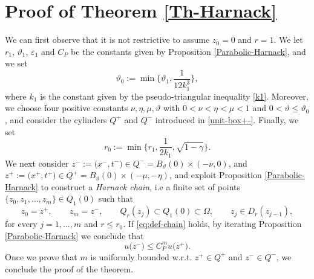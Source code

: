 \documentclass[11pt,a4paper]{article}
\numberwithin{equation}{section}
\def \e {{\varepsilon}}
\def \O {{\Omega}}
\begin{document}
{{\section{Proof of Theorem \ref{Th-Harnack}}\label{Harnack}
We can first observe that it is not restrictive to assume $z_0=0$ and $r=1$. We let $r_1$, $\vartheta_1 $, $\e_1$ and $C_P$ be the constants given by Proposition \ref{Parabolic-Harnack}, and we set
\begin{equation}\label{thetanot}
	\vartheta_0:=\min\Bigg\{\vartheta_1,\frac{1}{12 k^3_1}\Bigg\},
\end{equation}
where $k_1$ is the constant given by the pseudo-triangular inequality \eqref{k1}. Moreover, we choose four positive constants $\nu, \eta, \mu, \vartheta$ with $0 < \nu < \eta < \mu < 1$ and $0 < \vartheta \leq \vartheta_0$, and consider the cylinders $Q^+$ and $Q^-$ introduced in \eqref{unit-box+-}. Finally, we set
\begin{equation}\label{rnot}
	r_0:= \min \Bigg\{ r_1,\frac{1}{2k_1},\sqrt{1-\gamma}\Bigg\}.
\end{equation} 
We next consider $z^-:=\big(x^-,t^-\big) \in Q^-= B_{\vartheta}(0) \times (-\nu,0)$, and $z^+:=\big(x^+,t^+\big) \in Q^+=B_{\vartheta}(0) \times (-\mu,-\eta)$, and exploit Proposition \ref{Parabolic-Harnack} to construct a \textit{Harnack chain}, i.e a finite set of points $\lbrace z_0,z_1,\ldots,z_m\rbrace \in Q_1(0)$ such that
\begin{equation}\label{eq:def-chain}
	z_0=z^+, \qquad z_m=z^-, \qquad Q_r(z_j)\subset Q_1(0)\subset \O,\qquad z_j \in D_r(z_{j-1}),  
\end{equation}
for every $ j=1,\ldots,m$ and $r \leq r_0$. If \eqref{eq:def-chain} holds, by iterating Proposition \ref{Parabolic-Harnack} we conclude that
\begin{equation}
	u\big(z^-\big)\leq C_P^m u\big(z^+\big).
\end{equation}
Once we prove that $m$ is uniformly bounded w.r.t. $z^+ \in Q^+$ and $z^- \in Q^-$, we conclude the proof of the theorem. 


}}
\end{document}
